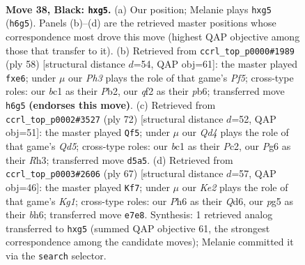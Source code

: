 \documentclass[11pt]{article}
\begin{document}
\clearpage

\begin{figure}[p]\centering
\begin{subfigure}{0.46\textwidth}\centering
\resizebox{\linewidth}{!}{%
\newchessgame
\chessboard[
  setfen={7r/r3k3/1pp1p1pp/3q2P1/Pp1P4/3KP3/R4Q2/2B5 b - - 3 38},
  showmover=false,
  pgfstyle=straightmove, color=movearrow, markmove={h6-g5}
]}
\caption{}
\end{subfigure}\hfill
\begin{subfigure}{0.46\textwidth}\centering
\resizebox{\linewidth}{!}{%
\newchessgame
\chessboard[
  setfen={4rk2/6p1/1p2p2p/2p2P2/p6q/P3Q2P/1P4P1/4R1K1 w - - 0 30},
  showmover=false,
  pgfstyle=straightmove, color=movearrow, markmove={f5-e6}
]}
\caption{}
\end{subfigure}
\\[4pt]
\begin{subfigure}{0.46\textwidth}\centering
\resizebox{\linewidth}{!}{%
\newchessgame
\chessboard[
  setfen={3r2k1/2b2pPp/8/2pQ2P1/pqPpP2P/7R/2P1K3/3R4 w - - 3 37},
  showmover=false,
  pgfstyle=straightmove, color=movearrow, markmove={d5-f5}
]}
\caption{}
\end{subfigure}\hfill
\begin{subfigure}{0.46\textwidth}\centering
\resizebox{\linewidth}{!}{%
\newchessgame
\chessboard[
  setfen={6k1/7p/p1pq3B/3r1bP1/1P1P1p2/8/P3QP2/3R2K1 b - - 0 34},
  showmover=false,
  pgfstyle=straightmove, color=movearrow, markmove={g8-f7}
]}
\caption{}
\end{subfigure}
\caption{\textbf{Move 38, Black: \texttt{hxg5}.} (a) Our position; Melanie plays \texttt{hxg5} (\texttt{h6g5}). Panels (b)--(d) are the retrieved master positions whose correspondence most drove this move (highest QAP objective among those that transfer to it). (b) Retrieved from \texttt{ccrl\_top\_p0000\#1989} (ply 58) [structural distance $d$=54, QAP obj=61]: the master played \texttt{fxe6}; under $\mu$ our \emph{Ph3} plays the role of that game's \emph{Pf5}; cross-type roles: our \emph{b}c1 as their \emph{P}b2, our \emph{q}f2 as their \emph{p}b6; transferred move \texttt{h6g5} \textbf{(endorses this move)}. (c) Retrieved from \texttt{ccrl\_top\_p0002\#3527} (ply 72) [structural distance $d$=52, QAP obj=51]: the master played \texttt{Qf5}; under $\mu$ our \emph{Qd4} plays the role of that game's \emph{Qd5}; cross-type roles: our \emph{b}c1 as their \emph{P}c2, our \emph{P}g6 as their \emph{R}h3; transferred move \texttt{d5a5}. (d) Retrieved from \texttt{ccrl\_top\_p0003\#2606} (ply 67) [structural distance $d$=57, QAP obj=46]: the master played \texttt{Kf7}; under $\mu$ our \emph{Ke2} plays the role of that game's \emph{Kg1}; cross-type roles: our \emph{P}h6 as their \emph{Q}d6, our \emph{p}g5 as their \emph{b}h6; transferred move \texttt{e7e8}. Synthesis: 1 retrieved analog transferred to \texttt{hxg5} (summed QAP objective 61, the strongest correspondence among the candidate moves); Melanie committed it via the \texttt{search} selector.}
\label{fig:thought-m75}
\end{figure}
\end{document}
